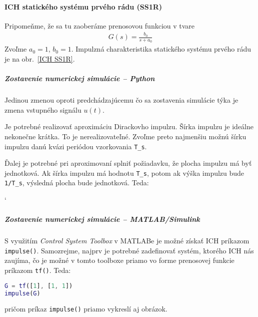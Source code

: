 \documentclass[a4paper, 10pt, ]{article}
\begin{document}
\paragraph{ICH statického systému prvého rádu (SS1R)}

Pripomeňme, že sa tu zaoberáme prenosovou funkciou v tvare
\begin{align} \label{typ1radtf4}
    G(s) = \frac{b_0}{s + a_0}
\end{align}
Zvoľme $a_0 = 1$, $b_0 = 1$. Impulzná charakteristika statického systému prvého rádu je na obr.~\ref{ICH SS1R}.

\begin{center}


	\label{ICH SS1R}

\end{center}



\subparagraph{Zostavenie numerickej simulácie -- Python}

Jedinou zmenou oproti predchádzajúcemu čo sa zostavenia simulácie týka je zmena vstupného signálu $u(t)$.

Je potrebné realizovať aproximáciu Dirackovho impulzu. Šírka impulzu je ideálne nekonečne krátka. To je nerealizovateľné. Zvoľme preto najmenšiu možnú šírku impulzu danú kvázi periódou vzorkovania \lstinline|T_s|.

Ďalej je potrebné pri aproximovaní splniť požiadavku, že plocha impulzu má byť jednotková. Ak šírka impulzu má hodnotu \lstinline|T_s|, potom ak výška impulzu bude \lstinline|1/T_s|, výsledná plocha bude jednotková. Teda:
{\catcode`

}
\noindent

\subparagraph{Zostavenie numerickej simulácie -- MATLAB/Simulink}

S využitím \emph{Control System Toolbox} v MATLABe je možné získať ICH príkazom  \lstinline|impulse()|. Samozrejme, najprv je potrebné zadefinovať systém, ktorého ICH nás zaujíma, čo je možné v tomto toolboxe priamo vo forme prenosovej funkcie príkazom  \lstinline|tf()|. Teda:
\begin{lstlisting}[language=Matlab,]
G = tf([1], [1, 1])
impulse(G)
\end{lstlisting}
\noindent
pričom príkaz \lstinline|impulse()| priamo vykreslí aj obrázok.
\end{document}
